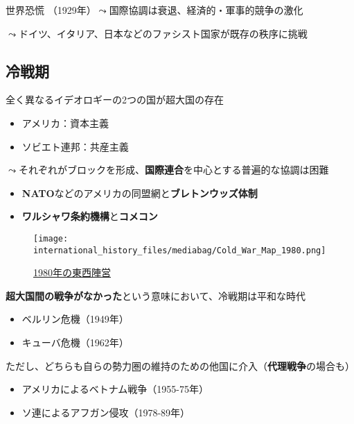 \documentclass[
  xelatex,
  ja=standard]{bxjsarticle}
\providecommand{\tightlist}{%
  \setlength{\itemsep}{0pt}\setlength{\parskip}{0pt}}\usepackage{longtable,booktabs,array}
\begin{document}
世界恐慌 （1929年）\(\leadsto\)国際協調は衰退、経済的・軍事的競争の激化

\(\leadsto\)ドイツ、イタリア、日本などのファシスト国家が既存の秩序に挑戦

\hypertarget{ux51b7ux6226ux671f}{%
\subsection{冷戦期}\label{ux51b7ux6226ux671f}}

全く異なるイデオロギーの2つの国が超大国の存在

\begin{itemize}
\tightlist
\item
  アメリカ：資本主義
\item
  ソビエト連邦：共産主義
\end{itemize}

\(\leadsto\)それぞれがブロックを形成、\textbf{国際連合}を中心とする普遍的な協調は困難

\begin{itemize}
\tightlist
\item
  \textbf{NATO}などのアメリカの同盟網と\textbf{ブレトンウッズ体制}
\item
  \textbf{ワルシャワ条約機構}と\textbf{コメコン}
\end{itemize}

\begin{figure}[htpb]

{\centering \texttt{[image: international\_history\_files/mediabag/Cold\_War\_Map\_1980.png]}

}

\caption{\href{https://commons.wikimedia.org/wiki/File:Cold_War_Map_1980.png}{1980年の東西陣営}}

\end{figure}

\textbf{超大国間の戦争がなかった}という意味において、冷戦期は平和な時代

\begin{itemize}
\tightlist
\item
  ベルリン危機（1949年）
\item
  キューバ危機（1962年）
\end{itemize}

ただし、どちらも自らの勢力圏の維持のための他国に介入（\textbf{代理戦争}の場合も）

\begin{itemize}
\tightlist
\item
  アメリカによるベトナム戦争（1955-75年）
\item
  ソ連によるアフガン侵攻（1978-89年）
\end{itemize}
\end{document}
